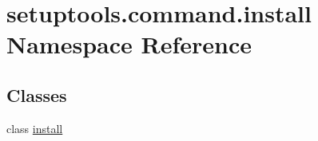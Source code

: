 \hypertarget{namespacesetuptools_1_1command_1_1install}{}\section{setuptools.\+command.\+install Namespace Reference}
\label{namespacesetuptools_1_1command_1_1install}
\subsection*{Classes}
\begin{DoxyCompactItemize}
\item 
class \hyperlink{classsetuptools_1_1command_1_1install_1_1install}{install}
\end{DoxyCompactItemize}
